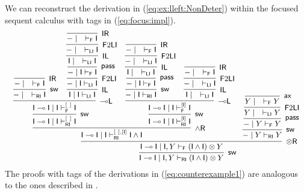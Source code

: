 \documentclass[submission,copyright,creativecommons]{eptcs}
\theoremstyle{definition}
\newcommand{\tr}{\otimes \mathsf{R}}
\newcommand{\lleft}{{\multimap}\mathsf{L}}
\newcommand{\pass}{\mathsf{pass}}
\newcommand{\unitl}{\mathsf{IL}}
\newcommand{\unitr}{\mathsf{IR}}
\newcommand{\andr}{\land \mathsf{R}}
\newcommand{\ax}{\mathsf{ax}}
\newcommand{\ot}{\otimes}
\newcommand{\lolli}{\multimap}
\newcommand{\I}{\mathsf{I}}
\newcommand{\RI}{\mathsf{RI}}
\newcommand{\LI}{\mathsf{LI}}
\newcommand{\F}{\mathsf{F}}
\newcommand{\sw}{\mathsf{sw}}
\newcommand{\proofbox}[1]{\begin{tabular}{l} #1 \end{tabular}}
\begin{document}
We can reconstruct the derivation in (\ref{eq:ex:lleft:NonDeter}) within the focused sequent calculus with tags in (\ref{eq:focus:impl}).
\begin{displaymath}\small
  \infer[\sw]{\I \lolli \I \mid \I , Y \vdash_{\RI} (\I \land \I) \ot Y}{
    \infer[\tr]{\I \lolli \I \mid \I , Y \vdash_{\F} (\I \land \I) \ot Y}{
      \infer[\andr]{\I \lolli \I \mid \I \vdash^{{[\ ]} , {[\I]}}_{\RI} \I \land \I}{
        \infer[\sw]{\I \lolli \I \mid \I \vdash^{{[\ ]}}_{\RI} \I}{
          \infer[\lleft]{\I \lolli \I \mid \I \vdash^{{[\ ]}}_{\F} \I}{
            \infer[\sw]{- \mid \quad \vdash_{\RI} \I}{
              \infer[\unitr]{- \mid \quad \vdash_{\F} \I}{}
            }
            &
            \infer[\unitl]{\I \mid \I \vdash_{\LI} \I}{
              \infer[\F 2 \LI]{- \mid \I \vdash_{\LI} \I}{
                \infer[\pass]{- \mid \I \vdash_{\F} \I}{
                  \infer[\unitl]{\I \mid \quad \vdash_{\LI} \I}{
                    \infer[\F 2 \LI]{- \mid \quad \vdash_{\LI} \I}{
                      \infer[\unitr]{- \mid \quad \vdash_{\F} \I}{}
                    }
                  }
                }
              }
            }
          }
        }
        &
        \infer[\sw]{\I \lolli \I \mid \I \vdash^{{[\I]}}_{\RI} \I}{
          \infer[\lleft]{\I \lolli \I \mid \I \vdash^{{[\I]}}_{\F} \I}{
            \infer[\sw]{- \mid \I \vdash_{\RI} \I}{
              \infer[\pass]{- \mid \I \vdash_{\F} \I}{
                \infer[\unitl]{\I \mid \quad \vdash_{\LI} \I}{
                  \infer[\F 2 \LI]{- \mid \quad \vdash_{\LI} \I}{
                    \infer[\unitr]{- \mid \quad \vdash_{\F} \I}{}
                  }
                }
              }
            }
            &
            \infer[\unitl]{\I \mid \quad \vdash_{\LI} \I}{
              \infer[\F 2 \LI]{- \mid \quad \vdash_{\LI} \I}{
                \infer[\unitr]{- \mid \quad \vdash_{\F} \I}{}
              }
            }
          }
        }
      }
      &
      \infer[\sw]{- \mid Y \vdash_{\RI} Y}{
        \infer[\pass]{- \mid Y \vdash_{\F} Y}{
          \infer[\F 2 \LI]{Y \mid \quad \vdash_{\LI} Y}{
            \infer[\ax]{Y \mid \quad \vdash_{\F} Y}{}
          }
        }
      }
    }
  }
\end{displaymath}
The proofs with tags of the derivations in (\ref{eq:counterexample1}) are analogous to the ones described in \cite{UVW:protsn}.
\end{document}
